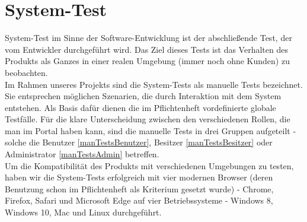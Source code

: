 \documentclass[parskip=full,11pt]{scrartcl}
\begin{document}
\newpage
\section{System-Test} \label{System-Test}
System-Test im Sinne der Software-Entwicklung ist der abschließende Test, der vom Entwickler durchgeführt wird. Das Ziel dieses Tests ist das Verhalten des Produkts als Ganzes in einer realen Umgebung (immer noch ohne Kunden) zu beobachten.\\
Im Rahmen unseres Projekts sind die System-Tests als manuelle Tests bezeichnet. Sie entsprechen möglichen Szenarien, die durch Interaktion mit dem System entstehen. Als Basis dafür dienen die im Pflichtenheft vordefinierte globale Testfälle. Für die klare Unterscheidung zwischen den verschiedenen Rollen, die man im Portal haben kann, sind die manuelle Tests in drei Gruppen aufgeteilt - solche die Benutzer \ref{manTestsBenutzer}, Besitzer \ref{manTestsBesitzer} oder Administrator \ref{manTestsAdmin} betreffen.\\
Um die Kompatibilität des Produkts mit verschiedenen Umgebungen zu testen, haben wir die System-Tests erfolgreich mit vier modernen Browser (deren Benutzung schon im Pflichtenheft als Kriterium gesetzt wurde) - Chrome, Firefox, Safari und Microsoft Edge auf vier Betriebssysteme - Windows 8, Windows 10, Mac und Linux durchgeführt.  
\end{document}
